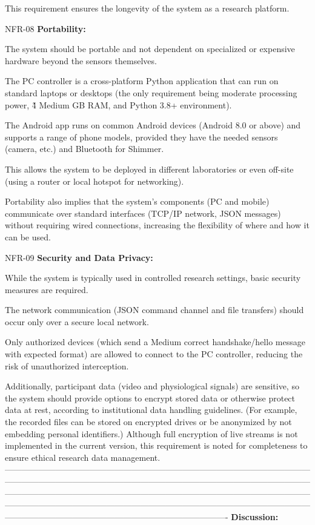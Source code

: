 This requirement ensures the longevity of the system as a research platform.

NFR-08 \textbf{Portability:}

The system should be portable and not dependent on specialized or expensive hardware beyond the sensors themselves.

The PC controller is a cross-platform Python application that can run on standard laptops or desktops (the only requirement being moderate processing power, \~4 Medium GB RAM, and Python 3.8+ environment).

The Android app runs on common Android devices (Android 8.0 or above) and supports a range of phone models, provided they have the needed sensors (camera, etc.) and Bluetooth for Shimmer.

This allows the system to be deployed in different laboratories or even off-site (using a router or local hotspot for networking).

Portability also implies that the system's components (PC and mobile) communicate over standard interfaces (TCP/IP network, JSON messages) without requiring wired connections, increasing the flexibility of where and how it can be used.

NFR-09 \textbf{Security and Data Privacy:}

While the system is typically used in controlled research settings, basic security measures are required.

The network communication (JSON command channel and file transfers) should occur only over a secure local network.

Only authorized devices (which send a Medium correct handshake/hello message with expected format) are allowed to connect to the PC controller, reducing the risk of unauthorized interception.

Additionally, participant data (video and physiological signals) are sensitive, so the system should provide options to encrypt stored data or otherwise protect data at rest, according to institutional data handling guidelines. (For example, the recorded files can be stored on encrypted drives or be anonymized by not embedding personal identifiers.) Although full encryption of live streams is not implemented in the current version, this requirement is noted for completeness to ensure ethical research data management. ------------------------------------------------------------------------------------------------------------------------------------------------------------------------------------------------------------------------------------------------------------------------------------------------------------------------------------------------------------------------------------------------------------------------------------------------------------------------------------------------------------------------------- \textbf{Discussion:}

